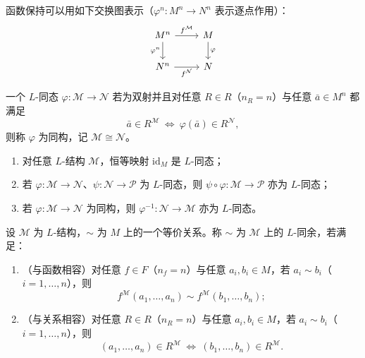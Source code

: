 \documentclass[lang=cn,a4paper,newtx,section]{elegantbook}
\begin{document}
\begin{remark}
函数保持可以用如下交换图表示（$\varphi^{n}:M^{n}\to N^{n}$ 表示逐点作用）：
\[
\begin{tikzcd}
M^{n} \arrow[r, "f^{\mathcal M}"] \arrow[d, "\varphi^{n}"'] & M \arrow[d, "\varphi"] \\
N^{n} \arrow[r, "f^{\mathcal N}"'] & N
\end{tikzcd}
\]
\end{remark}

\begin{definition}[同构]
一个 $L$-同态 $\varphi:\mathcal M\to\mathcal N$ 若为双射并且对任意 $R\in R$（$n_R=n$）与任意 $\bar a\in M^{n}$ 都满足
\[
  \bar a\in R^{\mathcal M}\ \Longleftrightarrow\ \varphi(\bar a)\in R^{\mathcal N},
\]
则称 $\varphi$ 为同构，记 $\mathcal M\cong\mathcal N$。
\end{definition}

\begin{proposition}
\begin{enumerate}
  \item 对任意 $L$-结构 $\mathcal M$，恒等映射 $\mathrm{id}_M$ 是 $L$-同态；
  \item 若 $\varphi:\mathcal M\to\mathcal N$、$\psi:\mathcal N\to\mathcal P$ 为 $L$-同态，则 $\psi\circ\varphi:\mathcal M\to\mathcal P$ 亦为 $L$-同态；
  \item 若 $\varphi:\mathcal M\to\mathcal N$ 为同构，则 $\varphi^{-1}:\mathcal N\to\mathcal M$ 亦为 $L$-同态。
\end{enumerate}
\end{proposition}

\begin{definition}[$L$-同余关系]
设 $\mathcal M$ 为 $L$-结构，$\sim$ 为 $M$ 上的一个等价关系。称 $\sim$ 为 $\mathcal M$ 上的 $L$-同余，若满足：
\begin{enumerate}
  \item （与函数相容）对任意 $f\in F$（$n_f=n$）与任意 $a_i,b_i\in M$，若 $a_i\sim b_i$（$i=1,\dots,n$），则
  \[
    f^{\mathcal M}(a_1,\dots,a_n)\sim f^{\mathcal M}(b_1,\dots,b_n);
  \]
  \item （与关系相容）对任意 $R\in R$（$n_R=n$）与任意 $a_i,b_i\in M$，若 $a_i\sim b_i$（$i=1,\dots,n$），则
  \[
    (a_1,\dots,a_n)\in R^{\mathcal M}\ \Longleftrightarrow\ (b_1,\dots,b_n)\in R^{\mathcal M}.
  \]
\end{enumerate}
\end{definition}
\end{document}
